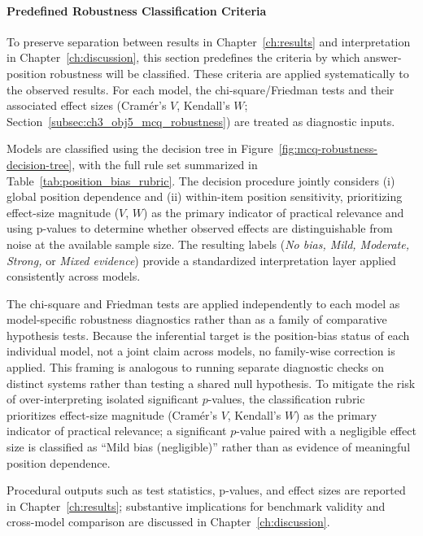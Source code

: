\paragraph{Predefined Robustness Classification Criteria}
\label{par:ch3_obj5_mcq_robustness_criteria}

To preserve separation between results in Chapter~\ref{ch:results} and interpretation in Chapter~\ref{ch:discussion}, this section predefines the criteria by which answer-position robustness will be classified. These criteria are applied systematically to the observed results. For each model, the chi-square/Friedman tests and their associated effect sizes (Cram\'{e}r’s $V$, Kendall’s $W$; Section~\ref{subsec:ch3_obj5_mcq_robustness}) are treated as diagnostic inputs.

Models are classified using the decision tree in Figure~\ref{fig:mcq-robustness-decision-tree}, with the full rule set summarized in Table~\ref{tab:position_bias_rubric}. The decision procedure jointly considers (i) global position dependence and (ii) within-item position sensitivity, prioritizing effect-size magnitude ($V$, $W$) as the primary indicator of practical relevance and using p-values to determine whether observed effects are distinguishable from noise at the available sample size. The resulting labels (\emph{No bias, Mild, Moderate, Strong,} or \emph{Mixed evidence}) provide a standardized interpretation layer applied consistently across models.

The chi-square and Friedman tests are applied independently to each model as model-specific robustness diagnostics rather than as a family of comparative hypothesis tests. Because the inferential target is the position-bias status of each individual model, not a joint claim across models, no family-wise correction is applied. This framing is analogous to running separate diagnostic checks on distinct systems rather than testing a shared null hypothesis. To mitigate the risk of over-interpreting isolated significant $p$-values, the classification rubric prioritizes effect-size magnitude (Cram\'{e}r's $V$, Kendall's $W$) as the primary indicator of practical relevance; a significant $p$-value paired with a negligible effect size is classified as ``Mild bias (negligible)'' rather than as evidence of meaningful position dependence. 


Procedural outputs such as test statistics, p-values, and effect sizes are reported in Chapter~\ref{ch:results}; substantive implications for benchmark validity and cross-model comparison are discussed in Chapter~\ref{ch:discussion}.

